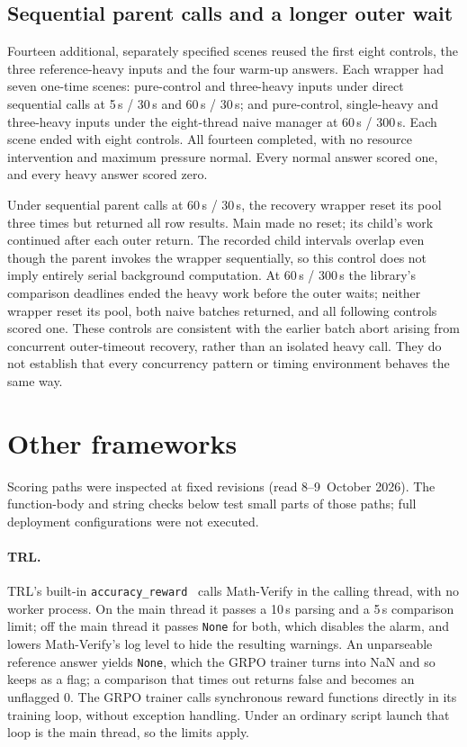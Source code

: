 \documentclass[10pt,a4paper]{article}
\newcommand{\mv}{Math-Verify}
\begin{document}
\subsection{Sequential parent calls and a longer outer wait}

Fourteen additional, separately specified scenes reused the first eight
controls, the three reference-heavy inputs and the four warm-up answers.
Each wrapper had seven one-time scenes: pure-control and three-heavy inputs
under direct sequential calls at 5\,s / 30\,s and 60\,s / 30\,s; and
pure-control, single-heavy and three-heavy inputs under the eight-thread
naive manager at 60\,s / 300\,s. Each scene ended with eight controls.
All fourteen completed, with no resource intervention and maximum pressure
normal. Every normal answer scored one, and every heavy answer scored zero.

Under sequential parent calls at 60\,s / 30\,s, the recovery wrapper reset
its pool three times but returned all row results. Main made no reset;
its child's work continued after each outer return. The recorded child
intervals overlap even though the parent invokes the wrapper sequentially,
so this control does not imply entirely serial background computation.
At 60\,s / 300\,s the library's comparison deadlines ended the heavy work
before the outer waits; neither wrapper reset its pool, both naive batches
returned, and all following controls scored one. These controls are
consistent with the earlier batch abort arising from concurrent
outer-timeout recovery, rather than an isolated heavy call. They do not
establish that every concurrency pattern or timing environment behaves
the same way.

\section{Other frameworks}
\label{sec:frameworks}
Scoring paths were inspected at fixed revisions (read 8--9~October 2026). The function-body and
string checks below test small parts of those paths; full deployment
configurations were not executed.

\paragraph{TRL.} TRL's built-in \texttt{accuracy\_reward}~\citep{trl} calls
\mv{} in the calling thread, with no worker process. On the main thread it
passes a 10\,s parsing and a 5\,s comparison limit; off the main thread it
passes \texttt{None} for both, which disables the alarm, and lowers \mv{}'s
log level to hide the resulting warnings. An unparseable reference answer
yields \texttt{None}, which the GRPO trainer turns into NaN and so keeps as a
flag; a comparison that times out returns false and becomes an unflagged $0$.
The GRPO trainer calls synchronous reward functions directly in its training
loop, without exception handling. Under an ordinary script launch that loop
is the main thread, so the limits apply.
\end{document}
